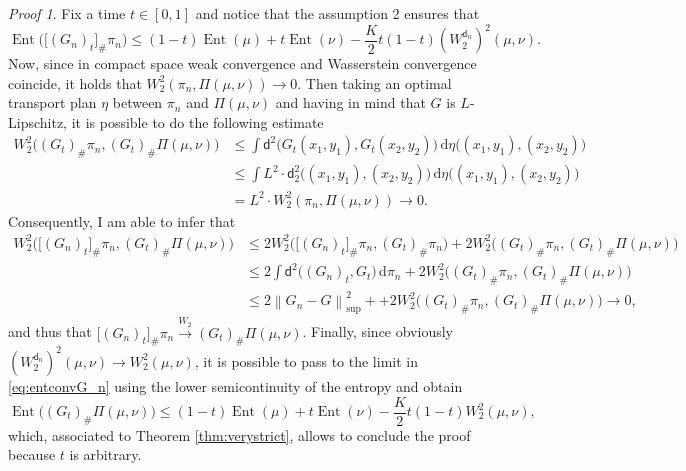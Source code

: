 \documentclass[11pt,twoside,a4paper]{article}
\newcommand{\norm}[1]{\left\lVert#1\right\rVert}
\newcommand{\de}{\ensuremath{\, \mathrm d}} %
\newcommand{\thmsymbol}{\( \square \)}
\newcommand{\di}{\mathsf d} %
\DeclareMathOperator{\Ent}{Ent}
\theoremstyle{theorem}
\theoremstyle{definition}
\theoremstyle{remark}
\theoremstyle{proof}
\newtheorem*{pro}{Proof}
\newenvironment{pr}{\begin{pro}%
 \renewcommand{\qedsymbol}{\thmsymbol}\pushQED{\qed}}%
 {\popQED\end{pro}}
\begin{document}
\begin{pr}
 Fix a time $t \in [0,1]$ and notice that the assumption 2 ensures that 
 \begin{equation}\label{eq:entconvG_n}
     \Ent\big( \big[(G_n)_t\big]_\# \pi_n\big) \leq (1-t) \Ent(\mu) + t \Ent(\nu) - \frac K2 t(1-t) (W_2^{\di_n})^2(\mu,\nu).
 \end{equation}
 Now, since in compact space weak convergence and Wasserstein convergence coincide, it holds that $W_2^2(\pi_n,\Pi(\mu,\nu))\to 0$. Then taking an optimal transport plan $\eta$ between $\pi_n$ and $\Pi(\mu,\nu)$ and having in mind that $G$ is $L$-Lipschitz, it is possible to do the following estimate
 \begin{align*}
     W^2_2 \big( (G_t)_\# \pi_n, (G_t)_\# \Pi(\mu,\nu)\big) &\leq \int \di^2 \big(G_t(x_1,y_1), G_t(x_2,y_2)\big) \de \eta \big((x_1,y_1),(x_2,y_2)\big)\\
     & \leq \int L^2 \cdot \di_2^2 \big((x_1,y_1),(x_2,y_2)\big)\de \eta \big((x_1,y_1),(x_2,y_2)\big) \\
     &= L^2 \cdot W_2^2(\pi_n,\Pi(\mu,\nu))\to 0.
 \end{align*}
 Consequently, I am able to infer that
 \begin{align*}
     W^2_2 \big( \big[(G_n)_t\big]_\# \pi_n, (G_t)_\# \Pi(\mu,\nu)\big) &\leq 2 W^2_2 \big( \big[(G_n)_t\big]_\# \pi_n, (G_t)_\# \pi_n\big)+ 2 W^2_2 \big( (G_t)_\# \pi_n, (G_t)_\# \Pi(\mu,\nu)\big)\\
     &\leq 2 \int \di^2 \big((G_n)_t, G_t\big) \de \pi_n + 2 W^2_2 \big( (G_t)_\# \pi_n, (G_t)_\# \Pi(\mu,\nu)\big)\\
     &\leq 2 \norm{G_n-G}_\text{sup}^2 + + 2 W^2_2 \big( (G_t)_\# \pi_n, (G_t)_\# \Pi(\mu,\nu)\big) \to 0,
 \end{align*}
 and thus that $\big[(G_n)_t\big]_\# \pi_n \xrightarrow{W_2} (G_t)_\# \Pi(\mu,\nu)$. Finally, since obviously $(W_2^{\di_n})^2(\mu,\nu) \to W_2^2(\mu,\nu)$, it is possible to pass to the limit in \eqref{eq:entconvG_n} using the lower semicontinuity of the entropy and obtain 
 \begin{equation*}
     \Ent\big( (G_t)_\# \Pi(\mu,\nu)\big) \leq (1-t) \Ent(\mu) + t \Ent(\nu) - \frac K2 t(1-t) W^2_2(\mu,\nu),
 \end{equation*}
 which, associated to Theorem \ref{thm:verystrict}, allows to conclude the proof because $t$ is arbitrary.
\end{pr}
\end{document}
